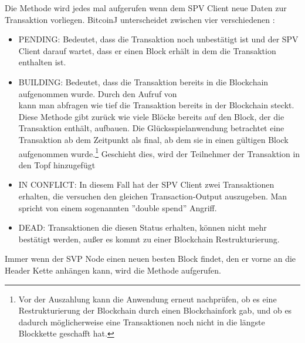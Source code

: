 
Die  Methode wird jedes mal aufgerufen wenn dem SPV Client neue Daten zur Transaktion vorliegen. BitcoinJ unterscheidet zwischen vier verschiedenen :
\begin{itemize}
\item PENDING: Bedeutet, dass die Transaktion noch unbestätigt ist und der SPV Client darauf wartet, dass er einen Block erhält in dem die Transaktion enthalten ist.
\item BUILDING: Bedeutet, dass die Transaktion bereits in die Blockchain aufgenommen wurde. Durch den Aufruf von\\  kann man abfragen wie tief die Transaktion bereits in der Blockchain steckt. Diese Methode gibt zurück wie viele Blöcke bereits auf den Block, der die Transaktion enthält, aufbauen. Die Glücksspielanwendung betrachtet eine Transaktion ab dem Zeitpunkt als final, ab dem sie in einen gültigen Block aufgenommen wurde.\footnote{Vor der Auszahlung kann die Anwendung erneut nachprüfen, ob es eine Restrukturierung der Blockchain durch einen Blockchainfork gab, und ob es dadurch möglicherweise eine Transaktionen noch nicht in die längste Blockkette geschafft hat.} Geschieht dies, wird der Teilnehmer der Transaktion in den Topf hinzugefügt
\item IN CONFLICT: In diesem Fall hat der SPV Client zwei Transaktionen erhalten, die versuchen den gleichen Transaction-Output auszugeben. Man spricht von einem sogenannten ''double spend'' Angriff. 
\item DEAD: Transaktionen die diesen Status erhalten, können nicht mehr bestätigt werden, außer es kommt zu einer Blockchain Restrukturierung.
\end{itemize}

Immer wenn der SVP Node einen neuen besten Block findet, den er vorne an die Header Kette anhängen kann, wird die  Methode aufgerufen.


